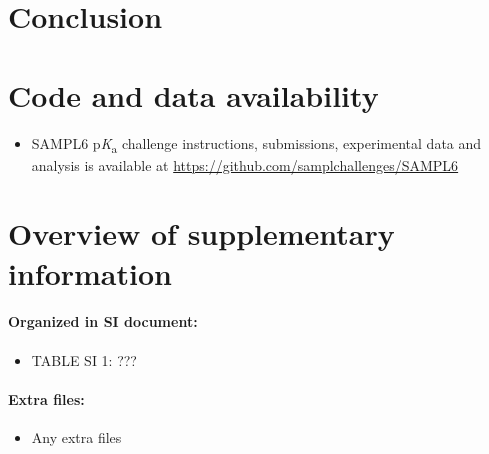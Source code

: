 \documentclass[9pt,lineno,final]{elife}
\newcommand{\pKa}{p\textit{K}\textsubscript{a}}
\begin{document}














\section{Conclusion}


\section{Code and data availability}
\begin{minipage}{15cm}
\begin{itemize}

\item SAMPL6 \pKa{} challenge instructions, submissions, experimental data and analysis is available at  \href{https://github.com/samplchallenges/SAMPL6}{https://github.com/samplchallenges/SAMPL6}

\end{itemize}
\end{minipage}


\section{Overview of supplementary information}

\paragraph{Organized in SI document:}

\begin{itemize}
\item TABLE SI 1: ???

\end{itemize}

\paragraph{Extra files:}  
\begin{itemize}
\item Any extra files
\end{itemize}
\end{document}
